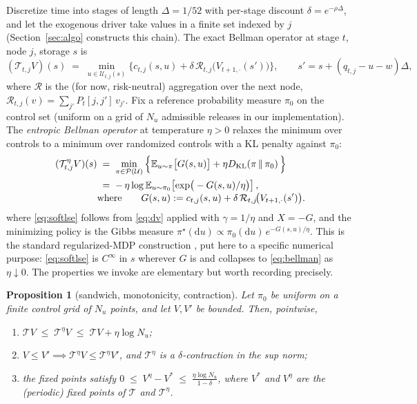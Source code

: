 \documentclass[pdflatex,sn-mathphys-num]{sn-jnl}
\theoremstyle{thmstyleone}
\newtheorem{proposition}[theorem]{Proposition}
\theoremstyle{thmstyletwo}
\theoremstyle{thmstylethree}
\newcommand{\dif}{\mathrm{d}}
\newcommand{\E}{\mathbb{E}}
\newcommand{\KL}[2]{D_{\mathrm{KL}}\!\left(#1 \,\middle\|\, #2\right)}
\begin{document}
Discretize time into stages of length $\Delta = 1/52$ with per-stage
discount $\delta = e^{-\rho\Delta}$, and let the exogenous driver take
values in a finite set indexed by $j$ (Section~\ref{sec:algo} constructs
this chain). The exact Bellman operator at stage $t$, node $j$, storage
$s$ is
\begin{equation}
(\mathcal T_{t,j} V)(s) \;=\;
\min_{u \in \mathcal U_{t,j}(s)}
\Big\{ c_{t,j}(s,u) + \delta\, \mathcal R_{t,j}\big(V_{t+1,\cdot}(s')\big) \Big\},
\qquad s' = s + (q_{t,j} - u - w)\Delta,
\label{eq:bellman}
\end{equation}
where $\mathcal R$ is the (for now, risk-neutral) aggregation over the next
node, $\mathcal R_{t,j}(v) = \sum_{j'} P_t[j,j']\,v_{j'}$. Fix a reference
probability measure $\pi_0$ on the control set (uniform on a grid of
$N_u$ admissible releases in our implementation). The
\emph{entropic Bellman operator} at temperature $\eta>0$ relaxes the
minimum over controls to a minimum over randomized controls with a KL
penalty against $\pi_0$:
\begin{align}
(\mathcal T^{\eta}_{t,j} V)(s)
&\;=\; \min_{\pi \in \mathcal P(\mathcal U)}
\Big\{ \E_{u\sim\pi}\big[G(s,u)\big] + \eta \KL{\pi}{\pi_0} \Big\}
\label{eq:softdef}\\
&\;=\; -\,\eta \log \E_{u \sim \pi_0}\!\left[
\exp\!\big(-G(s,u)/\eta\big)\right],
\label{eq:softlse}\\[-1mm]
&\text{where}\qquad
G(s,u) := c_{t,j}(s,u)
+ \delta\,\mathcal R_{t,j}\!\big(V_{t+1,\cdot}(s')\big).\notag
\end{align}
where \eqref{eq:softlse} follows from \eqref{eq:dv} applied with
$\gamma = 1/\eta$ and $X = -G$, and the minimizing policy is the Gibbs
measure $\pi^\star(\dif u) \propto \pi_0(\dif u)\,e^{-G(s,u)/\eta}$. This
is the standard regularized-MDP construction \citep{geist2019}, put here
to a specific numerical purpose: \eqref{eq:softlse} is $C^\infty$ in $s$
wherever $G$ is and collapses to
\eqref{eq:bellman} as $\eta \downarrow 0$. The properties we invoke are
elementary but worth recording precisely.

\begin{proposition}[sandwich, monotonicity, contraction]
\label{prop:soft}
Let $\pi_0$ be uniform on a finite control grid of $N_u$ points, and let
$V, V'$ be bounded. Then, pointwise,
\begin{enumerate}
\item[(i)] $\displaystyle \mathcal T V \;\le\; \mathcal T^{\eta} V
\;\le\; \mathcal T V + \eta \log N_u$;
\item[(ii)] $V \le V' \implies \mathcal T^{\eta} V \le \mathcal T^{\eta} V'$,
and $\mathcal T^\eta$ is a $\delta$-contraction in the sup norm;
\item[(iii)] the fixed points satisfy
$\displaystyle 0 \;\le\; V^{\eta} - V^{*} \;\le\; \frac{\eta \log N_u}{1-\delta}$,
where $V^*$ and $V^\eta$ are the (periodic) fixed points of $\mathcal T$
and $\mathcal T^\eta$.
\end{enumerate}
\end{proposition}
\end{document}
